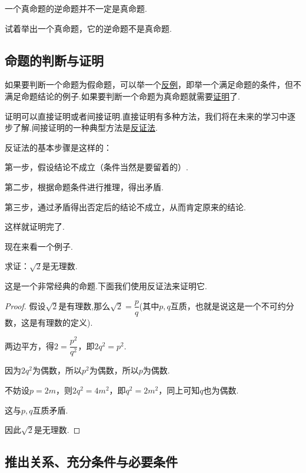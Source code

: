 \documentclass[lang=cn,math=cm,chinesefont=nofont,11pt,scheme=chinese,twocol]{elegantbook}
\begin{document}
\begin{remark}
  一个真命题的逆命题并不一定是真命题.
\end{remark}

\begin{exercise}\label{exer:202405021028}
  试着举出一个真命题，它的逆命题不是真命题.
\end{exercise}


\subsection{命题的判断与证明}

如果要判断一个命题为假命题，可以举一个\underline{反例}，即举一个满足命题的条件，但不满足命题结论的例子.如果要判断一个命题为真命题就需要\underline{证明}了.

证明可以直接证明或者间接证明.直接证明有多种方法，我们将在未来的学习中逐步了解.间接证明的一种典型方法是\underline{反证法}.

反证法的基本步骤是这样的：

第一步，假设结论不成立（条件当然是要留着的）.

第二步，根据命题条件进行推理，得出矛盾.

第三步，通过矛盾得出否定后的结论不成立，从而肯定原来的结论.

这样就证明完了.

\hspace*{\fill}

现在来看一个例子.

\begin{example}
  求证：$\sqrt{2}$是无理数.
\end{example}
这是一个非常经典的命题.下面我们使用反证法来证明它.
\begin{proof}
  假设$\sqrt{2}$是有理数,那么$\sqrt{2}=\dfrac{p}{q}$(其中$p,q$互质，也就是说这是一个不可约分数，这是有理数的定义).

  两边平方，得$2=\dfrac{p^2}{q^2}$，即$2q^2=p^2$.

  因为$2q^2$为偶数，所以$p^2$为偶数，所以$p$为偶数.

  不妨设$p=2m$，则$2q^2=4m^2$，即$q^2=2m^2$，同上可知$q$也为偶数.

  这与$p,q$互质矛盾.

  因此$\sqrt{2}$是无理数.

\end{proof}

\subsection{推出关系、充分条件与必要条件}
\end{document}
